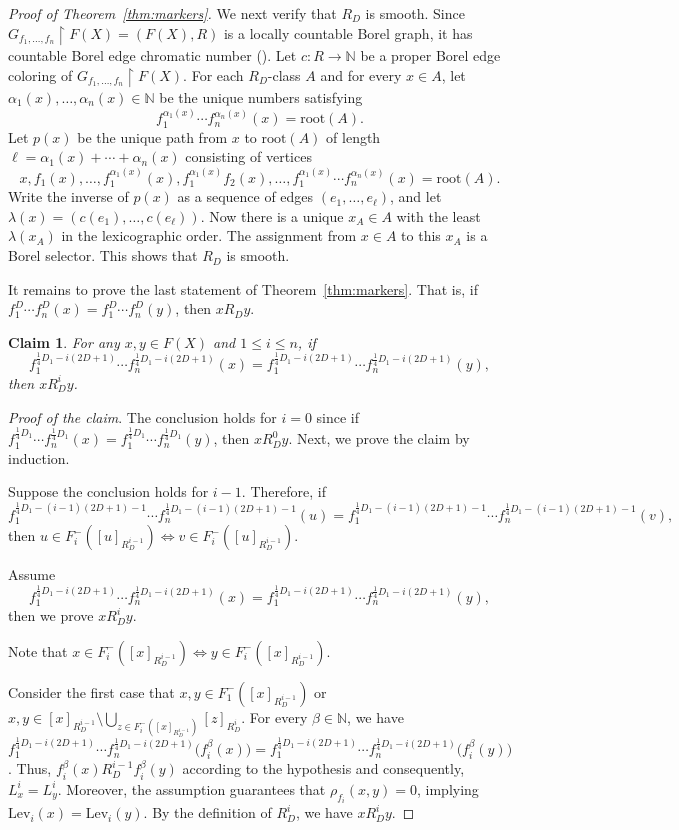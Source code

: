\documentclass[11pt, reqno, a4paper]{amsart}
\theoremstyle{definition}
\theoremstyle{plain}
\newtheorem{claim}{Claim}
\begin{document}
\begin{proof}[Proof of Theorem~\ref{thm:markers}]
We next verify that $R_D$ is smooth. Since $G_{f_1, \dots, f_n}\upharpoonright F(X)=(F(X), R)$ is a locally countable Borel graph, it has countable Borel edge chromatic number (\cite[Proposition 4.10]{KechrisSoleckiTodorcevic1999}). Let $c\colon R\to \mathbb{N}$ be a proper Borel edge coloring of $G_{f_1, \dots, f_n}\upharpoonright F(X)$. For each $R_D$-class $A$ and for every $x\in A$, let $\alpha_1(x), \dots, \alpha_n(x)\in \mathbb{N}$ be the unique numbers satisfying 
$$ f_1^{\alpha_1(x)}\cdots f_n^{\alpha_n(x)}(x)=\mbox{root}(A). $$
Let $p(x)$ be the unique path from $x$ to $\mbox{root}(A)$ of length $\ell=\alpha_1(x)+\cdots+\alpha_n(x)$ consisting of vertices
$$ x, f_1(x), \dots, f_1^{\alpha_1(x)}(x), f_1^{\alpha_1(x)}f_2(x), \dots, f_1^{\alpha_1(x)}\cdots f_n^{\alpha_n(x)}(x)=\mbox{root}(A). $$
Write the inverse of $p(x)$ as a sequence of edges $(e_1,\dots, e_\ell)$, and let $\lambda(x)=(c(e_1), \dots, c(e_\ell))$. Now there is a unique $x_A\in A$ with the least $\lambda(x_A)$ in the lexicographic order. The assignment from $x\in A$ to this $x_A$ is a Borel selector. This shows that $R_D$ is smooth.


It remains to prove the last statement of Theorem~\ref{thm:markers}.  That is, if $f_1^D\cdots f_n^D(x)=f_1^D\cdots f_n^D(y)$, then $xR_Dy$.
\begin{claim}\label{laststate}
     For any $x,y\in F(X)$ and $1\le i\le n$, if $$f_1^{\frac14D_1-i(2D+1)}\cdots f_n^{\frac14D_1-i(2D+1)}(x)=f_1^{\frac14D_1-i(2D+1)}\cdots f_n^{\frac14D_1-i(2D+1)}(y),$$ then $xR_D^iy$.
\end{claim}
\noindent\emph{Proof of the claim}.
The conclusion holds for $i=0$ since if $f_1^{\frac14D_1}\cdots f_n^{\frac14D_1}(x)=f_1^{\frac14D_1}\cdots f_n^{\frac14D_1}(y)$,
then $xR_D^0y$.  Next, we prove the claim by induction.

Suppose the conclusion holds for $i-1$. Therefore, if $$f_1^{\frac14D_1-(i-1)(2D+1)-1}\cdots f_n^{\frac14D_1-(i-1)(2D+1)-1}(u)=f_1^{\frac14D_1-(i-1)(2D+1)-1}\cdots f_n^{\frac14D_1-(i-1)(2D+1)-1}(v),$$ then $u\in F_i^-([u]_{R_D^{i-1}})\iff v\in F_i^-([u]_{R_D^{i-1}})$.

Assume $$f_1^{\frac14D_1-i(2D+1)}\cdots f_n^{\frac14D_1-i(2D+1)}(x)=f_1^{\frac14D_1-i(2D+1)}\cdots f_n^{\frac14D_1-i(2D+1)}(y),$$ then we prove $xR_D^iy$. 

Note that $x\in F_i^-([x]_{R_D^{i-1}})\iff y\in F_i^-([x]_{R_D^{i-1}})$.

Consider the first case that $x,y\in F_1^-([x]_{R_D^{i-1}})$ or $x,y\in [x]_{R_D^{i-1}}\setminus \bigcup_{z\in F_i^-([x]_{R_D^{i-1}})}[z]_{R_D^i}$. For every $\beta\in\mathbb N$, we have 
$f_1^{\frac14D_1-i(2D+1)}\cdots f_n^{\frac14D_1-i(2D+1)}\bigl(f_i^\beta(x)\bigr)
=
f_1^{\frac14D_1-i(2D+1)}\cdots f_n^{\frac14D_1-i(2D+1)}\bigl(f_i^\beta(y)\bigr)$. Thus, $f_i^\beta(x)R_D^{i-1}f_i^\beta(y)$ according to the hypothesis and consequently, $L_x^i=L_y^i$.
Moreover, the assumption guarantees that $\rho_{f_i}(x,y)=0$, implying
$\mathrm{Lev}_i(x)=\mathrm{Lev}_i(y)$. By the definition of $R_D^i$, we have $xR_D^i y$.


\end{proof}
\end{document}
